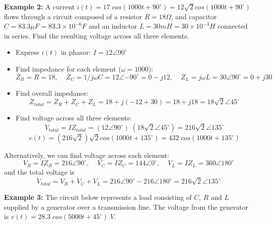 
{\bf Example 2:} A current $i(t)=17\;cos(1000t+90^\circ)=
12\sqrt{2}cos(1000t+90^\circ)$ flows
through a circuit composed of a resistor $R=18\Omega$, and capacitor
$C=83.3\mu F=83.3\times 10^{-6}F$ and an inductor $L=30 mH=30\times 
10^{-3}H$ connected in series. Find the resulting voltage across all 
three elements.

\begin{itemize}
\item Express $i(t)$ in phasor: $\dot{I}=12\angle{90^\circ}$
\item Find impedance for each element ($\omega=1000$):
\[	Z_R=R=18,\;\;\;\;Z_C=1/j\omega C=12\angle{-90^\circ}=0-j12,\;\;\;\;
	Z_L=j\omega L=30\angle{90^\circ}=0+j30	\]
\item Find overall impedance:
\[ Z_{total}=Z_R+Z_C+Z_L=18+j(-12+30)=18+j18=18\sqrt{2}\angle{45^\circ} \]
\item Find voltage across all three elements:
\[ \dot{V}_{total}=\dot{I}Z_{total}=(12\angle{90^\circ})\;(18\sqrt{2}\angle{45^\circ})=216\sqrt{2}\angle{135^\circ}	\]
\[	v(t)=(216\sqrt{2})\sqrt{2}cos(1000t+135^\circ)=432\;cos(1000t+135^\circ)	\]
\end{itemize}
Alternatively, we can find voltage across each element:
\[	V_R=IZ_R=216\angle{90^\circ},\;\;\;\;
	V_C=IZ_C=144\angle{0^\circ},\;\;\;\;
	V_L=IZ_L=360\angle{180^\circ}	\]
and the total voltage is
\[	\dot{V}_{total}=V_R+V_C+V_L=216\angle{90^\circ}-216\angle{180^\circ}
	=216\sqrt{2}\angle{135^\circ}	\]

{\bf Example 3:} The circuit below represents a load consisting of $C$, $R$
and $L$ supplied by a generator over a transmission line. The voltage from
the generator is $v(t)=28.3\;cos(5000t+45^\circ)\;V$.


